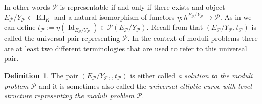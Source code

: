 \documentclass[a4paper,12pt,reqno]{amsart}
\makeatletter
\renewcommand{\listoftodos}[1][\@todonotes@todolistname]{%
	\@starttoc{tdo}{#1}}
\DeclareMathOperator{\id}{Id}
\DeclareMathOperator{\Ell}{Ell}
\theoremstyle{definition}
\newtheorem{definition}[lemma]{Definition}
\numberwithin{lemma}{section}
\numberwithin{equation}{section}
\numberwithin{figure}{section}
\makeatother
\begin{document}
In other words $\mathcal P$ is representable  if and only if  there exists and object $E_{\mathcal P}/Y_{\mathcal P} \in \Ell_K$ and a natural isomorphism of functors $\eta: h^{E_{\mathcal P}/Y_{\mathcal P}} \to \mathcal P$. As in  we can define $t_{\mathcal P} := \eta(\id_{E_{\mathcal P}/Y_{\mathcal P}}) \in \mathcal P (E_{\mathcal P}/Y_{\mathcal P}) $. Recall from   that $(E_{\mathcal P}/Y_{\mathcal P},t_{\mathcal P})$ is called the universal pair representing $\mathcal P$. In the context of moduli problems there are at least two different terminologies that are used to refer to this universal pair.
\begin{definition}\label{def:moduli-problem-solution}
	The pair $(E_{\mathcal P}/Y_{\mathcal P},,t_{\mathcal P})$ is either called \textit{a solution to the moduli problem $\mathcal P$} and it is sometimes also called the \textit{universal elliptic curve with level structure representing the moduli problem $\mathcal P$}.  
\end{definition}

\listoftodos


{}
\end{document}
